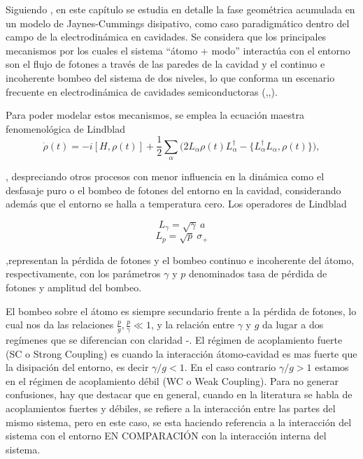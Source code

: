 Siguiendo \cite{Viotti2022}, en este capítulo se estudia en detalle la fase geométrica acumulada en un modelo de Jaynes-Cummings disipativo, como caso paradigmático dentro del campo de la electrodinámica en cavidades. Se considera que los principales mecanismos por los cuales el sistema “átomo + modo” interactúa con el entorno son el flujo de fotones a través de las paredes de la cavidad y el continuo e incoherente bombeo del sistema de dos niveles, lo que conforma un escenario frecuente en electrodinámica de cavidades semiconductoras (\cite{Khitrova2006},\cite{Laussy2009},\cite{DelValle2009}). 

Para poder modelar estos mecanismos, se emplea la ecuación maestra fenomenológica de Lindblad
\begin{equation}\label{eq3:lindblad}
\dot{\rho}(t) = -i [H, \rho(t)] + \frac{1}{2} \sum_\alpha \big( 2L_\alpha \rho(t) L_\alpha^{\dagger} - \{ L_\alpha^{\dagger}L_\alpha, \rho(t) \} \big),
\end{equation}

, despreciando otros procesos con menor influencia en la dinámica como el desfasaje puro o el bombeo de fotones del entorno en la cavidad, considerando además que el entorno se halla a temperatura cero. Los operadores de Lindblad

\begin{equation}
L_\gamma = \sqrt{\gamma} \ a
\end{equation}
\begin{equation}
L_p = \sqrt{p} \ \sigma_+
\end{equation}

,representan la pérdida de fotones y el bombeo continuo e incoherente del átomo, respectivamente, con los parámetros $\gamma$ y $p$ denominados tasa de pérdida de fotones y amplitud del bombeo. 

El bombeo sobre el átomo es siempre secundario frente a la pérdida de fotones, lo cual nos da las relaciones $\frac{p}{g},\frac{p}{\gamma} \ll 1$, y la relación entre $\gamma$ y $g$ da lugar a dos regímenes que se diferencian con claridad \cite{Carmi1989}-\cite{Lodhal2015}. El régimen de acoplamiento fuerte (SC o Strong Coupling) es cuando la interacción átomo-cavidad es mas fuerte que la disipación del entorno, es decir $\gamma /g <1$. En el caso contrario $\gamma/g>1$ estamos en el régimen de acoplamiento débil (WC o Weak Coupling). Para no generar confusiones, hay que destacar que en general, cuando en la literatura se habla de acoplamientos fuertes y débiles, se refiere a la interacción entre las partes del mismo sistema, pero en este caso, se esta haciendo referencia a la interacción del sistema con el entorno EN COMPARACIÓN con la interacción interna del sistema.
